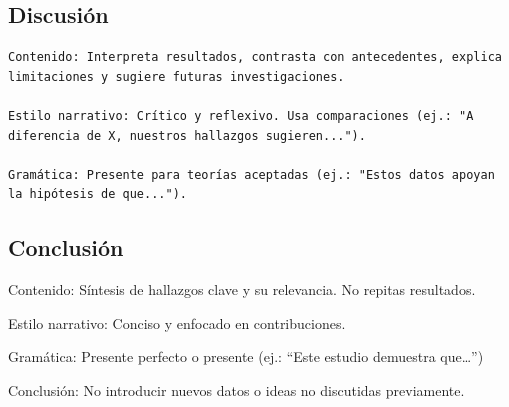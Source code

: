\documentclass[
]{article}
\begin{document}
\subsection{Discusión}\label{discusiuxf3n}

\begin{tcolorbox}[enhanced jigsaw, leftrule=.75mm, toprule=.15mm, colbacktitle=quarto-callout-tip-color!10!white, arc=.35mm, titlerule=0mm, coltitle=black, breakable, toptitle=1mm, bottomtitle=1mm, left=2mm, title=\textcolor{quarto-callout-tip-color}{\faLightbulb}\hspace{0.5em}{Tip}, colframe=quarto-callout-tip-color-frame, rightrule=.15mm, bottomrule=.15mm, opacitybacktitle=0.6, opacityback=0, colback=white]

\begin{verbatim}
Contenido: Interpreta resultados, contrasta con antecedentes, explica limitaciones y sugiere futuras investigaciones.

Estilo narrativo: Crítico y reflexivo. Usa comparaciones (ej.: "A diferencia de X, nuestros hallazgos sugieren...").

Gramática: Presente para teorías aceptadas (ej.: "Estos datos apoyan la hipótesis de que...").
\end{verbatim}

\end{tcolorbox}

\subsection{Conclusión}\label{conclusiuxf3n}

\begin{tcolorbox}[enhanced jigsaw, leftrule=.75mm, toprule=.15mm, colbacktitle=quarto-callout-tip-color!10!white, arc=.35mm, titlerule=0mm, coltitle=black, breakable, toptitle=1mm, bottomtitle=1mm, left=2mm, title=\textcolor{quarto-callout-tip-color}{\faLightbulb}\hspace{0.5em}{Tip}, colframe=quarto-callout-tip-color-frame, rightrule=.15mm, bottomrule=.15mm, opacitybacktitle=0.6, opacityback=0, colback=white]

Contenido: Síntesis de hallazgos clave y su relevancia. No repitas
resultados.

Estilo narrativo: Conciso y enfocado en contribuciones.

Gramática: Presente perfecto o presente (ej.: ``Este estudio demuestra
que\ldots{}'')

Conclusión: No introducir nuevos datos o ideas no discutidas
previamente.

\end{tcolorbox}
\end{document}
